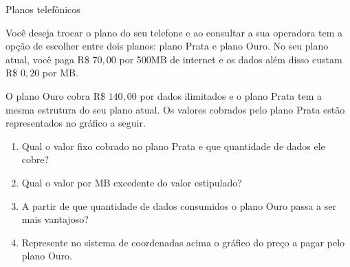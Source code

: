 \clearpage
\begin{task}{Planos telefônicos}

Você deseja trocar o plano do seu telefone e ao consultar a sua operadora tem a opção de escolher entre dois planos: plano Prata e plano Ouro. No seu plano atual, você paga R\$ $70{,}00$ por 500MB de internet e os dados além disso custam R\$ $0{,}20$ por MB. 

O plano Ouro cobra R\$ $140{,}00$ por dados ilimitados e o plano Prata tem a mesma estrutura do seu plano atual. Os valores cobrados pelo plano Prata estão representados no gráfico a seguir.

\begin{figure}[H]
\centering


\end{figure}

\begin{enumerate}
\item Qual o valor fixo cobrado no plano Prata e que quantidade de dados ele cobre?
\item Qual o valor por MB excedente do valor estipulado?
\item A partir de que quantidade de dados consumidos o plano Ouro passa a ser mais vantajoso?
\item Represente no sistema de coordenadas acima o gráfico do preço a pagar pelo plano Ouro.
\end{enumerate}

\end{task}

